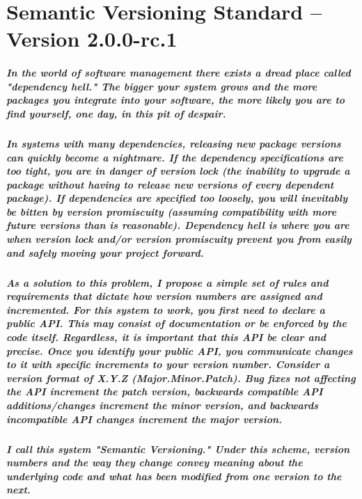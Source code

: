 \chapter{Semantic Versioning Standard -- Version 2.0.0-rc.1}
\label{app:semver}

\paragraph{
In the world of software management there exists a dread place called "dependency hell."
The bigger your system grows and the more packages you integrate into your software,
the more likely you are to find yourself, one day, in this pit of despair.
}

\paragraph{
In systems with many dependencies, releasing new package versions can quickly become a nightmare.
If the dependency specifications are too tight, you are in danger of version lock
(the inability to upgrade a package without having to release new versions of every
dependent package). If dependencies are specified too loosely, you will inevitably be
bitten by version promiscuity (assuming compatibility with more future versions than
  is reasonable). Dependency hell is where you are when version lock and/or version
promiscuity prevent you from easily and safely moving your project forward.
}

\paragraph{
As a solution to this problem, I propose a simple set of rules and requirements
that dictate how version numbers are assigned and incremented. For this system to
work, you first need to declare a public API. This may consist of documentation or
be enforced by the code itself. Regardless, it is important that this API be clear
and precise. Once you identify your public API, you communicate changes to it with
specific increments to your version number. Consider a version format of X.Y.Z (Major.Minor.Patch).
Bug fixes not affecting the API increment the patch version, backwards compatible API
additions/changes increment the minor version, and backwards incompatible API changes
increment the major version.
}

\paragraph{
I call this system "Semantic Versioning." Under this scheme, version numbers
and the way they change convey meaning about the underlying code and what has
been modified from one version to the next.
}

